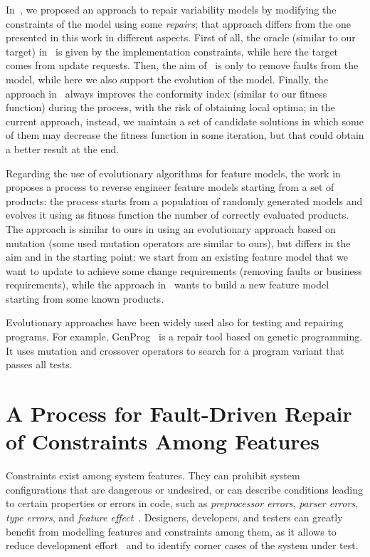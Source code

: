 \begin{tikzborder}{\cite{Gargantini16:validation}}
\begin{tikzborder}{\cite{gargantini_combinatorial_2017}}
\begin{tikzborder}{\cite{gargantini_combinatorial_2017}}
\begin{tikzborder}{\cite{garn2019}}
\begin{tikzborder}{\cite{arcaini2019achieving}}
	In~\cite{repairVarModelsSPLC2017}, we proposed an approach to repair variability models by modifying the constraints of the model using some \emph{repairs}; that approach differs from the one presented in this work in different aspects. First of all, the oracle (similar to our target) in~\cite{repairVarModelsSPLC2017} is given by the implementation constraints, while here the target comes from update requests. Then, the aim of~\cite{repairVarModelsSPLC2017} is only to remove faults from the model, while here we also support the evolution of the model. Finally, the approach in~\cite{repairVarModelsSPLC2017} always improves the conformity index (similar to our fitness function) during the process, with the risk of obtaining local optima; in the current approach, instead, we maintain a set of candidate solutions in which some of them may decrease the fitness function in some iteration, but that could obtain a better result at the end.
	
	Regarding the use of evolutionary algorithms for feature models, the work in~\cite{LopezHerrejon2015353} proposes a process to reverse engineer feature models starting from a set of products: the process starts from a population of randomly generated models and evolves it using as fitness function the number of correctly evaluated products. The approach is similar to ours in using an evolutionary approach based on mutation (some used mutation operators are similar to ours), but differs in the aim and in the starting point: we start from an existing feature model that we want to update to achieve some change requirements (removing faults or business requirements), while the approach in~\cite{LopezHerrejon2015353} wants to build a new feature model starting from some known products.
	
	Evolutionary approaches have been widely used also for testing and repairing programs. For example, GenProg~\cite{le_goues_systematic_2012} is a repair tool based on genetic programming. It uses mutation and crossover operators to search for a program variant that passes all tests.
	\be
	
	\section{A Process for Fault-Driven Repair of Constraints Among Features}\label{sec:arcaini2019varivolution}
	
	Constraints exist among system features. They can prohibit system configurations that are dangerous or undesired, or can describe conditions leading to certain properties or errors in code, such as \textit{preprocessor errors}, \textit{parser errors}, \textit{type errors}, and \textit{feature effect}~\cite{NadiBKC14}. Designers, developers, and testers can greatly benefit from modelling features and constraints among them, as it allows to reduce development effort~\cite{Petke15:practical} and to identify corner cases of the system under test.
	

\end{tikzborder}
\end{tikzborder}
\end{tikzborder}
\end{tikzborder}
\end{tikzborder}
